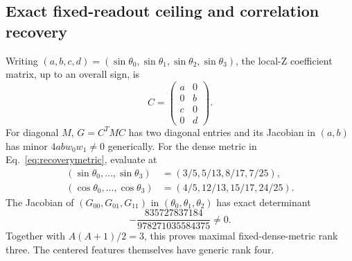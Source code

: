 \subsection{Exact fixed-readout ceiling and correlation recovery}
Writing $(a,b,c,d)=(\sin\theta_0,\sin\theta_1,
\sin\theta_2,\sin\theta_3)$, the local-Z coefficient matrix, up to
an overall sign, is
\begin{equation}
 C=\begin{pmatrix}a&0\\0&b\\c&0\\0&d\end{pmatrix}.
\end{equation}
For diagonal $M$, $G=C^TMC$ has two diagonal entries and its
Jacobian in $(a,b)$ has minor $4ab w_0w_1\ne0$ generically.
For the dense metric in Eq.~\eqref{eq:recoverymetric}, evaluate at
\begin{align}
 (\sin\theta_0,\ldots,\sin\theta_3)&=(3/5,5/13,8/17,7/25),\\
 (\cos\theta_0,\ldots,\cos\theta_3)&=(4/5,12/13,15/17,24/25).
\end{align}
The Jacobian of $(G_{00},G_{01},G_{11})$ in
$(\theta_0,\theta_1,\theta_2)$ has exact determinant
\begin{equation}
 -\frac{835727837184}{978271035584375}\ne0.
\end{equation}
Together with $A(A+1)/2=3$, this proves maximal fixed-dense-metric
rank three. The centered features themselves have generic rank four.

